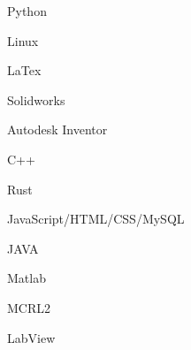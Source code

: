\begin{cSubsection}{}
    \begin{experienceItem} {}{Python}{}{} \end{experienceItem}
    \begin{experienceItem} {\hphantom{}}{Linux}{}{} \end{experienceItem}
    \begin{experienceItem} {\hphantom{}}{LaTex}{}{} \end{experienceItem}
    \begin{experienceItem} {\hphantom{}}{Solidworks}{}{} \end{experienceItem}
    \begin{experienceItem} {\hphantom{}}{Autodesk Inventor}{}{} \end{experienceItem}

    \begin{experienceItem} {}{C++}{}{} \end{experienceItem}
    \begin{experienceItem} {\hphantom{}}{Rust}{}{} \end{experienceItem}
    \begin{experienceItem} {\hphantom{}}{JavaScript/HTML/CSS/MySQL}{}{} \end{experienceItem}
    \begin{experienceItem} {\hphantom{}}{JAVA}{}{} \end{experienceItem}
    \begin{experienceItem} {\hphantom{}}{Matlab}{}{} \end{experienceItem}
    \begin{experienceItem} {\hphantom{}}{MCRL2}{}{} \end{experienceItem}
    \begin{experienceItem} {\hphantom{}}{LabView}{}{} \end{experienceItem}
\end{cSubsection}
